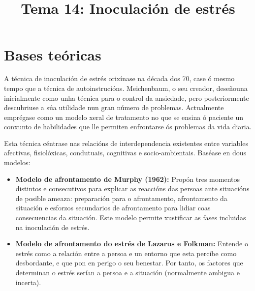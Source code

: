 \documentclass[a4paper,11pt]{article}
\title{Tema 14: Inoculación de estrés}
\date{}
\begin{document}
   

\maketitle 

\section{Bases teóricas}
A técnica de inoculación de estrés orixínase na década dos 70, case ó mesmo tempo que a técnica de autoinstrucións. Meichenbaum, o seu creador, deseñouna inicialmente como unha técnica para o control da ansiedade, pero posteriormente descubriuse a súa utilidade nun gran número de problemas. Actualmente emprégase como un modelo xeral de tratamento no que se ensina ó paciente un conxunto de habilidades que lle permiten enfrontarse ós problemas da vida diaria. 

Esta técnica céntrase nas relacións de interdependencia existentes entre variables afectivas, fisiolóxicas, condutuais, cognitivas e socio-ambientais. Baséase en dous modelos:
\begin{itemize}
	\item \textbf{Modelo de afrontamento de Murphy (1962):} Propón tres momentos distintos e 
	consecutivos para explicar as reaccións das persoas ante situacións de posible ameaza: 
	preparación para o afrontamento, afrontamento da situación e esforzos secundarios de afrontamento 
	para lidiar coas consecuencias da situación. Este modelo permite xustificar as fases incluidas na 
	inoculación de estrés. 
	\item \textbf{Modelo de afrontamento do estrés de Lazarus e Folkman:} Entende o estrés como a 
	relación entre a persoa e un entorno que esta percibe como desbordante, e que pon en perigo o seu 
	benestar. Por tanto, os factores que determinan o estrés serían a persoa e a situación 
	(normalmente ambigua e incerta). 
\end{itemize}
\end{document}
